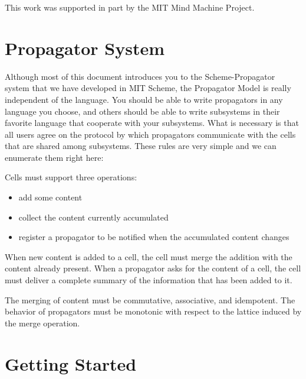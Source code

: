 \documentclass[12pt,letterpaper,english]{article}
\begin{document}
This work was supported in part by the MIT Mind Machine Project.

\tableofcontents


\hypertarget{propagator-system}{}
\section{Propagator System}
\label{propagator-system}

Although most of this document introduces you to the Scheme-Propagator
system that we have developed in MIT Scheme, the Propagator Model is
really independent of the language.  You should be able to write
propagators in any language you choose, and others should be able to
write subsystems in their favorite language that cooperate with your
subsystems.  What is necessary is that all users agree on the protocol
by which propagators communicate with the cells that are shared among
subsystems.  These rules are very simple and we can enumerate them
right here:

Cells must support three operations:
\begin{itemize}
\item {} 
add some content

\item {} 
collect the content currently accumulated

\item {} 
register a propagator to be notified when the accumulated content changes

\end{itemize}

When new content is added to a cell, the cell must merge the addition
with the content already present.  When a propagator asks for the
content of a cell, the cell must deliver a complete summary of the
information that has been added to it.

The merging of content must be commutative, associative, and
idempotent.  The behavior of propagators must be monotonic with
respect to the lattice induced by the merge operation.



\hypertarget{getting-started}{}
\section{Getting Started}
\label{getting-started}
\end{document}
